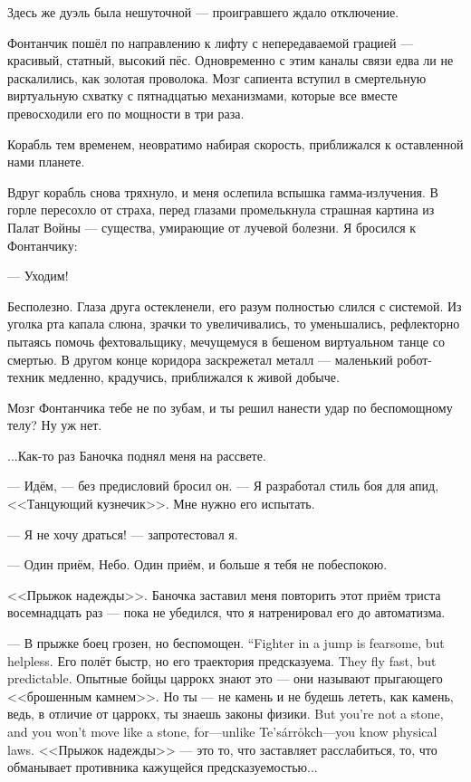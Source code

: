 Здесь же дуэль была нешуточной --- проигравшего ждало отключение.

Фонтанчик пошёл по направлению к лифту с непередаваемой грацией --- красивый, статный, высокий пёс.
Одновременно с этим каналы связи едва ли не раскалились, как золотая проволока.
Мозг сапиента вступил в смертельную виртуальную схватку с пятнадцатью механизмами, которые все вместе превосходили его по мощности в три раза.

Корабль тем временем, неовратимо набирая скорость, приближался к оставленной нами планете.

Вдруг корабль снова тряхнуло, и меня ослепила вспышка гамма-излучения.
В горле пересохло от страха, перед глазами промелькнула страшная картина из Палат Войны --- существа, умирающие от лучевой болезни.
Я бросился к Фонтанчику:

--- Уходим!

Бесполезно.
Глаза друга остекленели, его разум полностью слился с системой.
Из уголка рта капала слюна, зрачки то увеличивались, то уменьшались, рефлекторно пытаясь помочь фехтовальщику, мечущемуся в бешеном виртуальном танце со смертью.
В другом конце коридора заскрежетал металл --- маленький робот-техник медленно, крадучись, приближался к живой добыче.

Мозг Фонтанчика тебе не по зубам, и ты решил нанести удар по беспомощному телу?
Ну уж нет.

...Как-то раз Баночка поднял меня на рассвете.

--- Идём, --- без предисловий бросил он.
--- Я разработал стиль боя для апид, <<Танцующий кузнечик>>.
Мне нужно его испытать.

--- Я не хочу драться! --- запротестовал я.

--- Один приём, Небо.
Один приём, и больше я тебя не побеспокою.

<<Прыжок надежды>>.
Баночка заставил меня повторить этот приём триста восемнадцать раз --- пока не убедился, что я натренировал его до автоматизма.

{--- В прыжке боец грозен, но беспомощен.}
{``Fighter in a jump is fearsome, but helpless.}
{Его полёт быстр, но его траектория предсказуема.}
{They fly fast, but predictable.}
Опытные бойцы царрокх знают это --- они называют прыгающего <<брошенным камнем>>.
{Но ты --- не камень и не будешь лететь, как камень, ведь, в отличие от царрокх, ты знаешь законы физики.}
{But you're not a stone, and you won't move like a stone, for---unlike Te's\'{a}rr\r{o}kch---you know physical laws.}
<<Прыжок надежды>> --- это то, что заставляет расслабиться, то, что обманывает противника кажущейся предсказуемостью...

